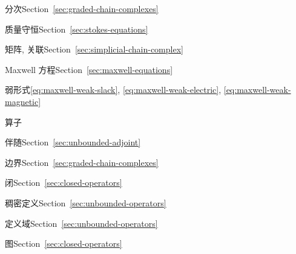 \begin{theindex}
\subitem {}\label{index:map-graded}{分次}\quad Section~\ref{sec:graded-chain-complexes}

\item {}\label{index:mass-conservation}{质量守恒}\quad Section~\ref{sec:stokes-equations}

\item {}\label{index:matrix-incidence}{矩阵, 关联}\quad Section~\ref{sec:simplicial-chain-complex}

\item {}\label{index:maxwell-s-equations}{Maxwell 方程}\quad Section~\ref{sec:maxwell-equations}

\subitem {}\label{index:maxwell-s-equations-weak-formulation}{弱形式}\quad \eqref{eq:maxwell-weak-slack}, \eqref{eq:maxwell-weak-electric}, \eqref{eq:maxwell-weak-magnetic}

\item {}\label{index:operator}{算子}

\subitem {}\label{index:operator-adjoint}{伴随}\quad Section~\ref{sec:unbounded-adjoint}

\subitem {}\label{index:operator-boundary}{边界}\quad Section~\ref{sec:graded-chain-complexes}

\subitem {}\label{index:operator-closed}{闭}\quad Section~\ref{sec:closed-operators}

\subitem {}\label{index:operator-densely-defined}{稠密定义}\quad Section~\ref{sec:unbounded-operators}

\subitem {}\label{index:operator-domain-of}{定义域}\quad Section~\ref{sec:unbounded-operators}

\subitem {}\label{index:operator-graph}{图}\quad Section~\ref{sec:closed-operators}


\end{theindex}

